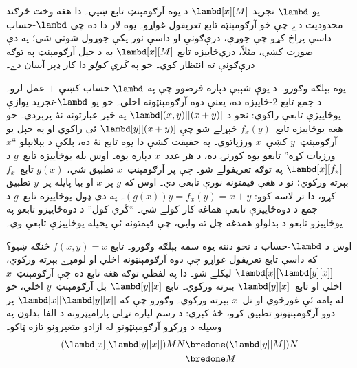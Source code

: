 \documentclass[../../../include/open-logic-section]{subfiles}
\begin{document}

يو $\lambd$-تجريد $\lambd[x][M]$ د يوه آرګومېنټ تابع ښيي۔ دا هغه
وخت څرګند محدوديت دے چې څو آرګومېنټه تابع تعريفول غواړو۔ يوه لار دا
ده چې $\lambd$-حساب داسې پراخ کړو چې جوړې، درې‌ګونې او داسې نور پکې
جوړول شوني شي؛ په دې صورت کښې، مثلاً، درې‌ځاييزه تابع
$\lambd[x][M]$ به د خپل آرګومېنټ په توګه درې‌ګونې ته انتظار کوي۔
خو په \emph{کَري کولو} دا کار ډېر آسان دے۔

يوه بېلګه وګورو۔ د يوې شېبې دپاره فرضوو چې په $\lambd$-حساب کښې
$+$ عمل لرو۔ د جمع تابع $2$-ځاييزه ده، يعنې دوه آرګومېنټونه اخلي۔
خو يو $\lambd$-تجريد يوازې يوځاييزې تابعې راکوي: نحو د
$\lambd[(x,y)][(x+y)]$ په څېر عبارتونه نۀ پرېږدي۔ خو هغه يوځاييزه
تابع~$f_x(y)$ څېړلے شو چې $\lambd[y][(x+y)]$ ئې راکوي او په خپل
يو آرګومېنټ~$y$ کښې~$x$ ورزياتوي۔ په حقيقت کښې دا يوه تابع نۀ ده،
بلکې د بېلابېلو ``$x$ ورزيات کړه'' تابعو يوه کورنۍ ده، د هر عدد~$x$
دپاره يوه۔ اوس بله يوځاييزه تابع~$g$ د $\lambd[x][f_x]$ په توګه
تعريفولے شو۔ چې پر آرګومېنټ~$x$ تطبيق شي، $g(x)$ تابع~$f_x$
بېرته ورکوي؛ نو د هغې قيمتونه نورې تابعې دي۔ اوس که $g$ پر $x$ او
بيا پايله پر~$y$ تطبيق کړو، دا تر لاسه کوو:
$(g(x))y = f_x(y) = x+y$۔ په دې ډول يوځاييزه تابع~$g$ د جمع د
دوه‌ځاييزې تابعې هماغه کار کولے شي۔ ``کَري کول'' د دوه‌ځاييزو تابعو
په يوځاييزو تابعو د بدلولو همدغه چل ته وايي، چې قيمتونه ئې پخپله
يوځاييزې تابعې وي۔

اوس د $\lambd$-حساب د نحو دننه يوه سمه بېلګه وګورو۔ تابع
$f(x,y) = x$ څنګه ښيو؟ که داسې تابع تعريفول غواړو چې دوه
آرګومېنټونه اخلي او لومړے بېرته ورکوي،
$\lambd[x][\lambd[y][x]]$ ليکلے شو۔ دا په لفظي توګه هغه تابع ده
چې آرګومېنټ~$x$ اخلي او تابع~$\lambd[y][x]$ بېرته ورکوي۔ تابع
$\lambd[y][x]$ بل آرګومېنټ~$y$ اخلي، خو له پامه ئې غورځوي او تل~$x$
بېرته ورکوي۔ وګورو چې که $\lambd[x][\lambd[y][x]]$ پر دوو
آرګومېنټونو تطبيق کړو، څۀ کېږي:
د رسم لپاره تړلي پاراميټرونه د الفا-بدلون په وسيله د ورکړو آرګومېنټونو له ازادو متغيرونو تازه ټاکو۔
\begin{align*}
  (\lambd[x][\lambd[y][x]])MN
  \bredone & (\lambd[y][M])N \\
  \bredone & M
\end{align*}
\end{document}
